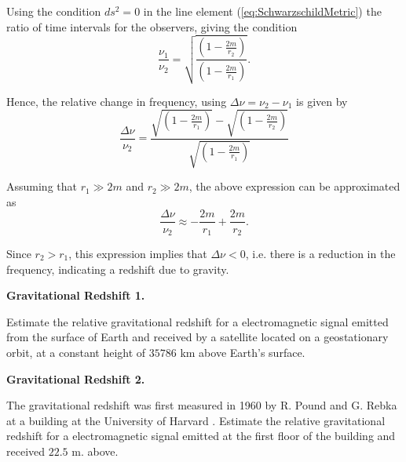 Using the condition $ds^2 = 0$ in the line element (\ref{eq:SchwarzschildMetric}) the ratio of time intervals for the observers, giving the condition
\begin{equation}
\frac{\nu_1 }{ \nu_2 } = \sqrt{ \frac{ \left( 1 - \frac{2m}{r_2} \right) }{ \left( 1 - \frac{2m}{r_1} \right) } }.
\end{equation}

Hence, the relative change in frequency, using $\Delta \nu = \nu_2 - \nu_1  $ is given by
\begin{equation}
\frac{\Delta \nu}{\nu_2} = \frac{ \sqrt{ \left( 1 - \frac{2m}{r_1} \right) } - \sqrt{ \left( 1 - \frac{2m}{r_2} \right) } } { \sqrt{\left( 1 - \frac{2m}{r_1} \right) } }
\end{equation}

Assuming that $r_1 \gg 2m$ and $r_2 \gg 2m$, the above expression can be approximated as
\begin{equation}
\frac{\Delta \nu}{\nu_2} \approx  - \frac{2m}{r_1} + \frac{2m}{r_2}.
\end{equation}

Since $r_2 > r_1$, this expression implies that $\Delta \nu <0$, i.e. there is a reduction in the frequency, indicating a redshift due to gravity.

\begin{exercise}[GravitationalRedshift01]
\textbf{Gravitational Redshift 1.}

Estimate the relative gravitational redshift for a electromagnetic signal emitted from the surface of Earth and received by a satellite located on a geostationary orbit, at a constant height of $35786$ km above Earth's surface.
\end{exercise}

\begin{exercise}[GravitationalRedshift02]
\textbf{Gravitational Redshift 2.}

The gravitational redshift was first measured in 1960 by R. Pound and G. Rebka at a building at the University of Harvard \cite{PoundRebka1959, PoundRebka1960, Klaus1996}.  Estimate the relative gravitational redshift for a electromagnetic signal emitted at the first floor of the building and received $22.5$ m. above. 
\end{exercise}